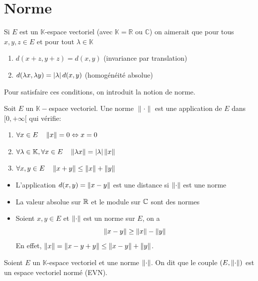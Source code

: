 \section{Norme}
Si $E$ est un $\mathbb{K}$-espace vectoriel (avec $\mathbb{K}=\mathbb{R} \text{ ou } \mathbb{C}$) on aimerait que pour tous $x,y,z\in E$ et pour tout $\lambda\in \mathbb{K}$
\begin{enumerate}
    \item $d(x+z,y+z)=d(x,y)$ \quad (invariance par translation)
    \item $d(\lambda x,\lambda y)=\left| \lambda \right|d(x,y)$ \quad (homogénéité absolue)
\end{enumerate}
Pour satisfaire ces conditions, on introduit la notion de norme.
\begin{definition}
    Soit $E$ un $\mathbb{K}-$espace vectoriel. Une norme $\lVert \cdot\rVert$ est une application de $E$ dans $[0,+\infty[$ qui vérifie:
    \begin{enumerate}
        \item $\forall x\in E \quad \left\| x \right\|=0 \Leftrightarrow x=0$
        \item $\forall\lambda\in \mathbb{K}, \forall x\in E\quad \left\| \lambda x \right\|=|\lambda|\left\| x \right\|$
        \item $\forall x,y\in E \quad \left\| x+y \right\|\leq \left\| x \right\|+\left\| y \right\|$
    \end{enumerate}
\end{definition}
\begin{remarque}
    \begin{itemize}
        \item L'application $d(x,y)= \left\| x-y \right\|$ est une distance si $\left\| \cdot \right\|$ est une norme
        \item La valeur absolue sur $\mathbb{R}$ et le module sur $\mathbb{C}$ sont des normes
        \item Soient $x,y\in E$ et $\left\| \cdot \right\|$ est un norme sur $E$, on a 
        $$
        \left\| x-y \right\| \ge \left\| x \right\|- \left\| y \right\|
        $$
        En effet, $\left\| x \right\|= \left\| x-y+y \right\|\le \left\| x-y \right\|+\left\| y \right\|$.
    \end{itemize}
\end{remarque}
\begin{definition}
    Soient $E$ un $\mathbb{K}$-espace vectoriel et une norme $\left\| \cdot \right\|$. On dit que le couple $(E,\left\| \cdot \right\|)$ est un espace vectoriel normé (EVN).
\end{definition}

